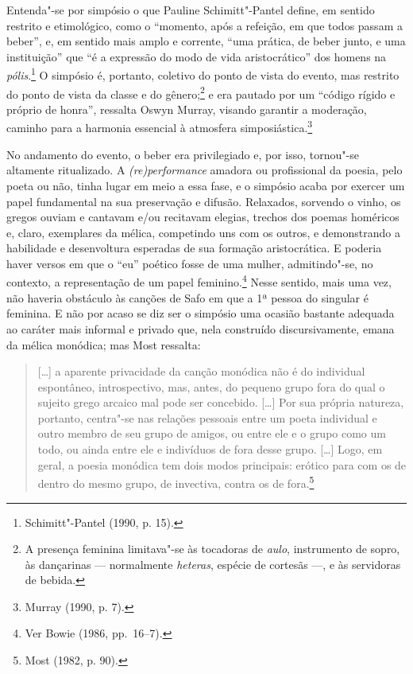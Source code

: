 Entenda"-se por simpósio o que Pauline Schimitt"-Pantel define, em
sentido restrito e etimológico, como o “momento, após a refeição, em que todos
passam a beber”, e, em sentido mais amplo e corrente, “uma prática, de beber
junto, e uma instituição” que “é a expressão do modo de vida aristocrático” dos
homens na \textit{pólis}.\footnote{ Schimitt"-Pantel (1990, p. 15).} O simpósio
é, portanto, coletivo do ponto de vista do
evento, mas restrito do ponto de vista da classe e do gênero;\footnote{A presença
feminina limitava"-se às tocadoras de \textit{aulo}, instrumento de sopro, às
dançarinas --- normalmente \textit{heteras}, espécie de cortesãs ---, e às servidoras de bebida.} e era pautado por um
“código rígido e próprio de honra”, ressalta Oswyn Murray, visando
garantir a moderação, caminho para a harmonia essencial à atmosfera
simposiástica.\footnote{ Murray (1990, p. 7).}

No andamento do evento, o beber era privilegiado e, por isso, tornou"-se
altamente ritualizado. A \textit{(re)performance} amadora ou profissional da
poesia, pelo poeta ou não, tinha lugar em meio a essa fase, e o simpósio acaba
por exercer um papel fundamental na sua preservação e difusão. Relaxados,
sorvendo o vinho, os gregos ouviam e cantavam e/ou recitavam elegias, trechos
dos poemas homéricos e, claro, exemplares da mélica, competindo uns com os
outros, e demonstrando a habilidade e desenvoltura esperadas de sua formação
aristocrática. E poderia haver
versos em que o “eu” poético fosse de uma mulher, admitindo"-se, no contexto, a
representação de um papel feminino.\footnote{ Ver Bowie (1986, pp.~16--7).}
Nesse sentido, mais uma vez, não haveria obstáculo às canções de Safo em que a
1ª pessoa do singular é feminina. E não por acaso se diz ser o simpósio uma
ocasião bastante adequada ao caráter mais informal e privado que, nela construído discursivamente, emana da mélica monódica; mas Most ressalta:

\begin{quote}
\mbox[\ldots{}] a aparente privacidade da canção monódica não é do individual espontâneo,
introspectivo, mas, antes, do pequeno grupo fora do qual o sujeito grego
arcaico mal pode ser concebido. [\ldots{}] Por sua própria natureza, portanto,
centra"-se nas relações pessoais entre um poeta individual e outro membro de seu
grupo de amigos, ou entre ele e o grupo como um todo, ou ainda entre ele e
indivíduos de fora desse grupo. [\ldots{}] Logo, em geral, a poesia monódica tem
dois modos principais: erótico para com os de dentro do mesmo grupo, de
invectiva, contra os de fora.\footnote{ Most (1982, p. 90).}
\end{quote}

